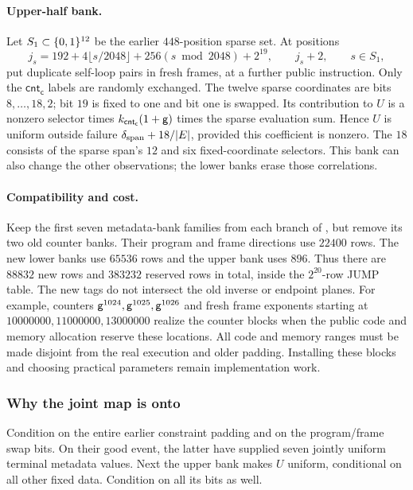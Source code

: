 \paragraph{Upper-half bank.} Let $S_1\subset\{0,1\}^{12}$ be the earlier $448$-position sparse set. At positions
\[
 j_s=192+4\lfloor s/2048\rfloor+256(s\bmod2048)+2^{19},
 \qquad j_s+2,\qquad s\in S_1,
\]
put duplicate self-loop pairs in fresh frames, at a further public instruction. Only the $\mathsf{cnt_c}$ labels are randomly exchanged. The twelve sparse coordinates are bits $8,\ldots,18,2$; bit $19$ is fixed to one and bit one is swapped. Its contribution to $U$ is a nonzero selector times $k_{\mathsf{cnt_c}}(1+\mathsf{g})$ times the sparse evaluation sum. Hence $U$ is uniform outside failure $\delta_{\mathrm{span}}+18/|E|$, provided this coefficient is nonzero. The $18$ consists of the sparse span's $12$ and six fixed-coordinate selectors. This bank can also change the other observations; the lower banks erase those correlations.

\paragraph{Compatibility and cost.} Keep the first seven metadata-bank families from each branch of , but remove its two old counter banks. Their program and frame directions use $22400$ rows. The new lower banks use $65536$ rows and the upper bank uses $896$. Thus there are $88832$ new rows and $383232$ reserved rows in total, inside the $2^{20}$-row JUMP table. The new tags do not intersect the old inverse or endpoint planes. For example, counters $\mathsf{g}^{1024},\mathsf{g}^{1025},\mathsf{g}^{1026}$ and fresh frame exponents starting at $10000000,11000000,13000000$ realize the counter blocks when the public code and memory allocation reserve these locations. All code and memory ranges must be made disjoint from the real execution and older padding. Installing these blocks and choosing practical parameters remain implementation work.

\subsubsection{Why the joint map is onto}

Condition on the entire earlier constraint padding and on the program/frame swap bits. On their good event, the latter have supplied seven jointly uniform terminal metadata values. Next the upper bank makes $U$ uniform, conditional on all other fixed data. Condition on all its bits as well.


